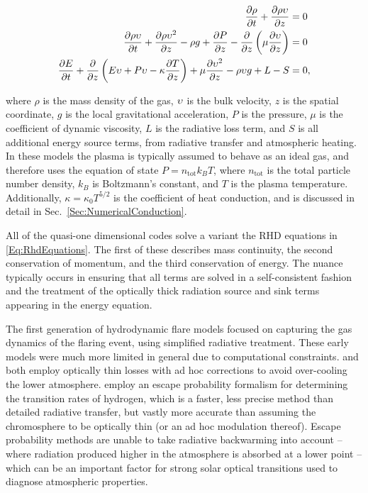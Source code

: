\begin{equation}
    \begin{aligned}
    \frac{\partial \rho}{\partial t} + \frac{\partial \rho \upsilon}{\partial z} &= 0\\
    \frac{\partial \rho \upsilon}{\partial t} + \frac{\partial \rho \upsilon^2}{\partial z} - \rho g + \frac{\partial P}{\partial z} - \frac{\partial}{\partial z}\left(\mu \frac{\partial \upsilon}{\partial z}\right) &= 0\\
    \frac{\partial E}{\partial t} + \frac{\partial}{\partial z}\left( E\upsilon + P\upsilon - \kappa\frac{\partial T}{\partial z} \right)+ \mu\frac{\partial \upsilon^2}{\partial z} -\rho \upsilon g + L - S &= 0,
    \end{aligned}\label{Eq:RhdEquations}
\end{equation}

where $\rho$ is the mass density of the gas, $\upsilon$ is the bulk velocity, $z$ is the spatial coordinate, $g$ is the local gravitational acceleration, $P$ is the pressure, $\mu$ is the coefficient of dynamic viscosity, $L$ is the radiative loss term, and $S$ is all additional energy source terms, from radiative transfer and atmospheric heating.
In these models the plasma is typically assumed to behave as an ideal gas, and therefore uses the equation of state
$P = n_{\mathrm{tot}} k_B T$, where $n_{\mathrm{tot}}$ is the total particle number density, $k_B$ is Boltzmann's constant, and $T$ is the plasma temperature. Additionally, $\kappa=\kappa_0 T^{5/2}$ is the coefficient of heat conduction, and is discussed in detail in Sec.~\ref{Sec:NumericalConduction}.

All of the quasi-one dimensional codes solve a variant the RHD equations in \eqref{Eq:RhdEquations}. The first of these describes mass continuity, the second conservation of momentum, and the third conservation of energy.
The nuance typically occurs in ensuring that all terms are solved in a self-consistent fashion and the treatment of the optically thick radiation source and sink terms appearing in the energy equation.

The first generation of hydrodynamic flare models \citet{Nagai1980,Mariska1982,McClymont1983} focused on capturing the gas dynamics of the flaring event, using simplified radiative treatment.
These early models were much more limited in general due to computational constraints. \citet{Nagai1980} and \citet{Mariska1982} both employ optically thin losses with ad hoc corrections to avoid over-cooling the lower atmosphere.
\citet{McClymont1983} employ an escape probability formalism for determining the transition rates of hydrogen, which is a faster, less precise method than detailed radiative transfer, but vastly more accurate than assuming the chromosphere to be optically thin (or an ad hoc modulation thereof).
Escape probability methods are unable to take radiative backwarming into account -- where radiation produced higher in the atmosphere is absorbed at a lower point -- which can be an important factor for strong solar optical transitions used to diagnose atmospheric properties.

